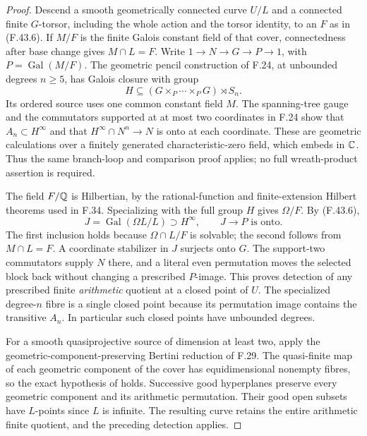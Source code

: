 \begin{proof}
Descend a smooth geometrically connected curve $U/L$
and a connected finite $G$-torsor, including the whole
action and the torsor identity, to an $F$ as in
(F.43.6). If $M/F$ is the finite Galois constant
field of that cover, connectedness after base change
gives $M\cap L=F$. Write
$1\to N\to G\to P\to1$, with
$P=\operatorname{Gal}(M/F)$.
The geometric pencil construction of F.24, at unbounded
degrees $n\ge5$, has Galois closure with group
\[
 H\subseteq(G\times_P\cdots\times_PG)\rtimes S_n.
\]
Its ordered source uses one common constant field $M$.
The spanning-tree gauge and the commutators supported
at at most two coordinates in F.24 show that
$A_n\subset H^\infty$ and that
$H^\infty\cap N^n\to N$ is onto at each coordinate.
These are geometric calculations over a finitely
generated characteristic-zero field, which embeds
in $\mathbb C$. Thus the same branch-loop and comparison
proof applies; no full wreath-product assertion is
required.

The field $F/\mathbb Q$ is Hilbertian, by the rational-function
and finite-extension Hilbert theorems used in F.34.
Specializing with the full group $H$ gives
$\Omega/F$. By (F.43.6),
\[
       J=\operatorname{Gal}(\Omega L/L)\supset H^\infty,
       \qquad J\longrightarrow P\text{ is onto}.             \tag{F.43.7}
\]
The first inclusion holds because $\Omega\cap L/F$
is solvable; the second follows from $M\cap L=F$.
A coordinate stabilizer in $J$ surjects onto $G$.
The support-two commutators supply $N$ there, and
a literal even permutation moves the selected block
back without changing a prescribed $P$-image.
This proves detection of any prescribed finite
\emph{arithmetic} quotient at a closed point of $U$.
The specialized degree-$n$ fibre is a single closed
point because its permutation image contains the
transitive $A_n$. In particular such closed points
have unbounded degrees.

For a smooth quasiprojective source of dimension
at least two, apply the geometric-component-preserving
Bertini reduction of F.29. The quasi-finite map of
each geometric component of the cover has equidimensional
nonempty fibres, so the exact hypothesis of
\citet[Theorem~1.5]{F_PoonenSlavov2020} holds.
Successive good hyperplanes preserve every geometric
component and its arithmetic permutation. Their good
open subsets have $L$-points since $L$ is infinite.
The resulting curve retains the entire arithmetic
finite quotient, and the preceding detection applies.


\end{proof}
